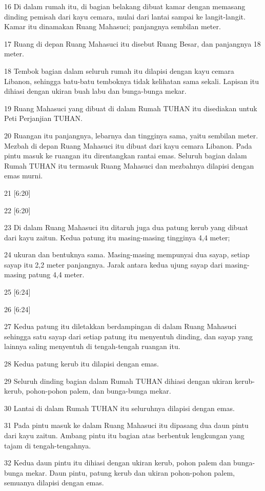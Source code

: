\par 16 Di dalam rumah itu, di bagian belakang dibuat kamar dengan memasang dinding pemisah dari kayu cemara, mulai dari lantai sampai ke langit-langit. Kamar itu dinamakan Ruang Mahasuci; panjangnya sembilan meter.
\par 17 Ruang di depan Ruang Mahasuci itu disebut Ruang Besar, dan panjangnya 18 meter.
\par 18 Tembok bagian dalam seluruh rumah itu dilapisi dengan kayu cemara Libanon, sehingga batu-batu temboknya tidak kelihatan sama sekali. Lapisan itu dihiasi dengan ukiran buah labu dan bunga-bunga mekar.
\par 19 Ruang Mahasuci yang dibuat di dalam Rumah TUHAN itu disediakan untuk Peti Perjanjian TUHAN.
\par 20 Ruangan itu panjangnya, lebarnya dan tingginya sama, yaitu sembilan meter. Mezbah di depan Ruang Mahasuci itu dibuat dari kayu cemara Libanon. Pada pintu masuk ke ruangan itu direntangkan rantai emas. Seluruh bagian dalam Rumah TUHAN itu termasuk Ruang Mahasuci dan mezbahnya dilapisi dengan emas murni.
\par 21 [6:20]
\par 22 [6:20]
\par 23 Di dalam Ruang Mahasuci itu ditaruh juga dua patung kerub yang dibuat dari kayu zaitun. Kedua patung itu masing-masing tingginya 4,4 meter;
\par 24 ukuran dan bentuknya sama. Masing-masing mempunyai dua sayap, setiap sayap itu 2,2 meter panjangnya. Jarak antara kedua ujung sayap dari masing-masing patung 4,4 meter.
\par 25 [6:24]
\par 26 [6:24]
\par 27 Kedua patung itu diletakkan berdampingan di dalam Ruang Mahasuci sehingga satu sayap dari setiap patung itu menyentuh dinding, dan sayap yang lainnya saling menyentuh di tengah-tengah ruangan itu.
\par 28 Kedua patung kerub itu dilapisi dengan emas.
\par 29 Seluruh dinding bagian dalam Rumah TUHAN dihiasi dengan ukiran kerub-kerub, pohon-pohon palem, dan bunga-bunga mekar.
\par 30 Lantai di dalam Rumah TUHAN itu seluruhnya dilapisi dengan emas.
\par 31 Pada pintu masuk ke dalam Ruang Mahasuci itu dipasang dua daun pintu dari kayu zaitun. Ambang pintu itu bagian atas berbentuk lengkungan yang tajam di tengah-tengahnya.
\par 32 Kedua daun pintu itu dihiasi dengan ukiran kerub, pohon palem dan bunga-bunga mekar. Daun pintu, patung kerub dan ukiran pohon-pohon palem, semuanya dilapisi dengan emas.
